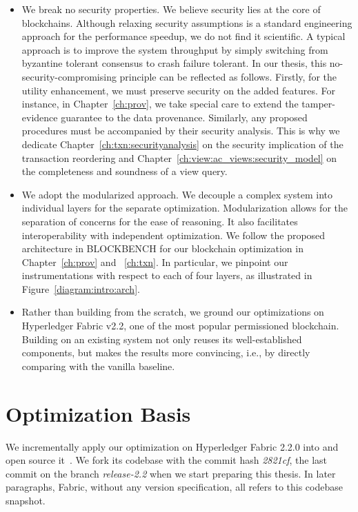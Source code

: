\begin{itemize}
  \item We break no security properties. We believe security lies at the core of blockchains. Although relaxing security assumptions is a standard engineering approach for the performance speedup, we do not find it scientific. A typical approach is to improve the system throughput by simply switching from byzantine tolerant consensus to crash failure tolerant. In our thesis, this no-security-compromising principle can be reflected as follows. Firstly, for the utility enhancement, we must preserve security on the added features. For instance, in Chapter~\ref{ch:prov}, we take special care to extend the tamper-evidence guarantee to the data provenance. Similarly, any proposed procedures must be accompanied by their security analysis. This is why we dedicate Chapter~\ref{ch:txn:securityanalysis} on the security implication of the transaction reordering and Chapter~\ref{ch:view:ac_views:security_model} on the completeness and soundness of a view query. 
  \item We adopt the modularized approach. We decouple a complex system into individual layers for the separate optimization. Modularization allows for the separation of concerns for the ease of reasoning. It also facilitates interoperability with independent optimization. 
  We follow the proposed architecture in BLOCKBENCH for our blockchain optimization in Chapter~\ref{ch:prov} and ~\ref{ch:txn}. In particular, we pinpoint our instrumentations with respect to each of four layers, as illustrated in Figure~\ref{diagram:intro:arch}. 
  \item Rather than building from the scratch, we ground our optimizations on Hyperledger Fabric v2.2, one of the most popular permissioned blockchain. Building on an existing system not only reuses its well-established components, but makes the results more convincing, i.e., by directly comparing with the vanilla baseline. 
\end{itemize}

\section{Optimization Basis}
\label{ch:intro:basis}
We incrementally apply our optimization on Hyperledger Fabric 2.2.0 into {\fs} and open source it~\cite{fsharp}. We fork its codebase with the commit hash \textit{2821cf}, the last commit on the branch \textit{release-2.2} when we start preparing this thesis. In later paragraphs, Fabric, without any version specification, all refers to this codebase snapshot. 

